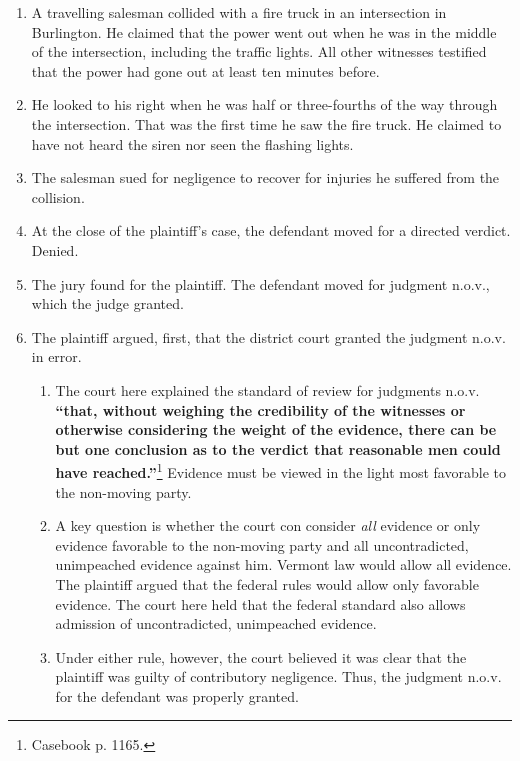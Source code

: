 \begin{enumerate}
    \item A travelling salesman collided with a fire truck in an intersection 
    in Burlington. He claimed that the power went out when he was in the 
    middle of the intersection, including the traffic lights. All other 
    witnesses testified that the power had gone out at least ten minutes 
    before.
    \item He looked to his right when he was half or three-fourths of the way 
    through the intersection. That was the first time he saw the fire truck. 
    He claimed to have not heard the siren nor seen the flashing lights.
    \item The salesman sued for negligence to recover for injuries he suffered 
    from the collision.
    \item At the close of the plaintiff's case, the defendant moved for a 
    directed verdict. Denied.
    \item The jury found for the plaintiff. The defendant moved for judgment 
    n.o.v., which the judge granted.
    \item The plaintiff argued, first, that the district court granted the 
    judgment n.o.v. in error.
    \begin{enumerate}
        \item The court here explained the standard of review for judgments 
        n.o.v. \textbf{``that, without weighing the credibility of the 
        witnesses or otherwise considering the weight of the evidence, there 
        can be but one conclusion as to the verdict that reasonable men could 
        have reached.''}\footnote{Casebook p. 1165.} Evidence must be viewed 
        in the light most favorable to the non-moving party.
        \item A key question is whether the court con consider \emph{all} 
        evidence or only evidence favorable to the non-moving party and all 
        uncontradicted, unimpeached evidence against him. Vermont law would 
        allow all evidence. The plaintiff argued that the federal rules would 
        allow only favorable evidence. The court here held that the federal 
        standard also allows admission of uncontradicted, unimpeached 
        evidence.
        \item Under either rule, however, the court believed it was clear that 
        the plaintiff was guilty of contributory negligence. Thus, the 
        judgment n.o.v. for the defendant was properly granted.
    \end{enumerate}

\end{enumerate}
